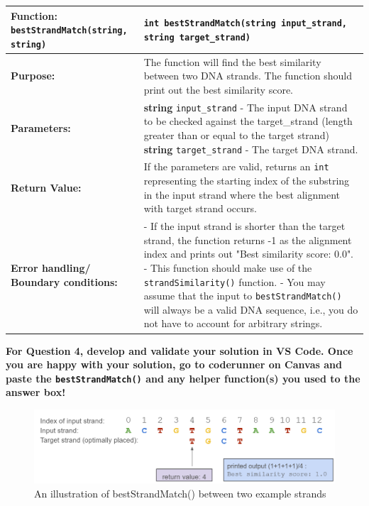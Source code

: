 \begin{longtable}{|p{1.7in}|p{4.0in}|}
    \hline
    \textbf{Function:} \texttt{bestStrandMatch(string, string)}
        & 
        \texttt{int bestStrandMatch(string input_strand, }
        \texttt{string target_strand)}

        \\ \hline
    
    \textbf{Purpose:} 
        & 
        The function will find the best similarity between two DNA strands. The function should print out the best similarity score.
        \\ \hline
    
    \textbf{Parameters:} 
        & 
        \textbf{string} \texttt{input\_strand} - The input DNA strand to be checked against the target\_strand (length greater than or equal to the target strand) \newline
\textbf{string} \texttt{target\_strand} - The target DNA strand.\\ \hline
    
    \textbf{Return Value:} 
        & 
        If the parameters are valid, returns an \texttt{int} representing the starting index of the substring in the input strand where the best alignment with target strand occurs.
        
        \\ \hline
    \textbf{Error handling/ Boundary conditions:} 
        &
        - If the input strand is shorter than the target strand, the function returns -1 as the alignment index and prints out "Best similarity score: 0.0". \newline
- This function should make use of the \texttt{strandSimilarity()} function. \newline
- You may assume that the input to \texttt{bestStrandMatch()} will always be a valid DNA sequence, i.e., you do not have to account for arbitrary strings.\\ \hline
\end{longtable}

\textbf{For Question 4, develop and validate your solution in VS Code. Once you are happy with your solution, go to coderunner on Canvas and paste the \texttt{bestStrandMatch()} and any helper function(s) you used to the answer box!}  

\begin{figure}[htp]
    \centering
    \includegraphics[width=12cm]{images/project1/BestSimilarity.png}
    \caption{An illustration of bestStrandMatch() between two example strands}
    \label{fig:galaxy}
\end{figure}


